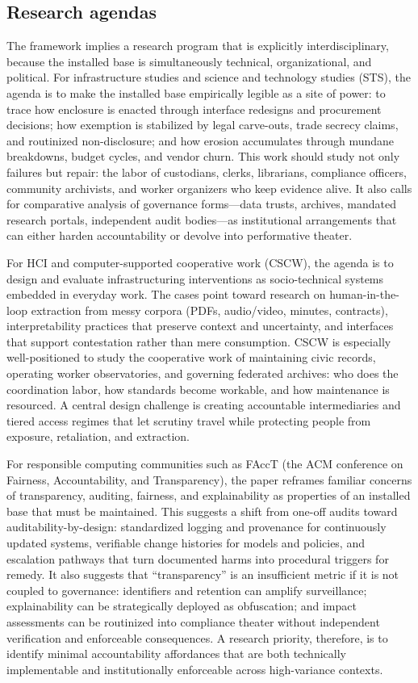 \documentclass[acmsmall,screen]{acmart}
\begin{document}
\subsection*{Research agendas}
The framework implies a research program that is explicitly interdisciplinary, because the installed base is simultaneously technical, organizational, and political. For infrastructure studies and science and technology studies (STS), the agenda is to make the installed base empirically legible as a site of power: to trace how enclosure is enacted through interface redesigns and procurement decisions; how exemption is stabilized by legal carve-outs, trade secrecy claims, and routinized non-disclosure; and how erosion accumulates through mundane breakdowns, budget cycles, and vendor churn. This work should study not only failures but repair: the labor of custodians, clerks, librarians, compliance officers, community archivists, and worker organizers who keep evidence alive. It also calls for comparative analysis of governance forms---data trusts, archives, mandated research portals, independent audit bodies---as institutional arrangements that can either harden accountability or devolve into performative theater.

For HCI and computer-supported cooperative work (CSCW), the agenda is to design and evaluate infrastructuring interventions as socio-technical systems embedded in everyday work. The cases point toward research on human-in-the-loop extraction from messy corpora (PDFs, audio/video, minutes, contracts), interpretability practices that preserve context and uncertainty, and interfaces that support contestation rather than mere consumption. CSCW is especially well-positioned to study the cooperative work of maintaining civic records, operating worker observatories, and governing federated archives: who does the coordination labor, how standards become workable, and how maintenance is resourced. A central design challenge is creating accountable intermediaries and tiered access regimes that let scrutiny travel while protecting people from exposure, retaliation, and extraction.

For responsible computing communities such as FAccT (the ACM conference on Fairness, Accountability, and Transparency), the paper reframes familiar concerns of transparency, auditing, fairness, and explainability as properties of an installed base that must be maintained. This suggests a shift from one-off audits toward auditability-by-design: standardized logging and provenance for continuously updated systems, verifiable change histories for models and policies, and escalation pathways that turn documented harms into procedural triggers for remedy. It also suggests that ``transparency'' is an insufficient metric if it is not coupled to governance: identifiers and retention can amplify surveillance; explainability can be strategically deployed as obfuscation; and impact assessments can be routinized into compliance theater without independent verification and enforceable consequences. A research priority, therefore, is to identify minimal accountability affordances that are both technically implementable and institutionally enforceable across high-variance contexts.
\end{document}

